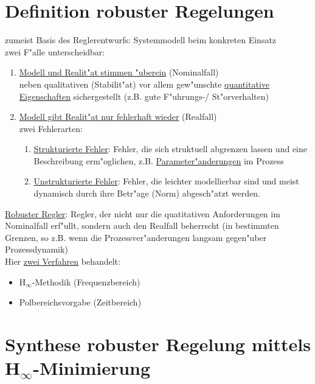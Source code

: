\documentclass[openany,a4paper,11pt]{book}
\begin{document}
\section{Definition robuster Regelungen}
zumeist Basis des Reglerentwurfs: Systemmodell beim konkreten Einsatz\\
zwei F"alle unterscheidbar: \begin{enumerate}
    \item \uline{Modell und Realit"at stimmen "uberein} (Nominalfall)\\
    neben qualitativen (Stabilit"at) vor allem gew"unschte \uline{quantitative Eigenschaften} sichergestellt (z.B. gute F"uhrungs-/ St"orverhalten)
    \item \uline{Modell gibt Realit"at nur fehlerhaft wieder} (Realfall)\\
    zwei Fehlerarten:\begin{enumerate}
        \item \uline{Strukturierte Fehler}: Fehler, die sich struktuell abgrenzen lassen und eine Beschreibung erm"oglichen, z.B. \uline{Parameter"anderungen} im Prozess
        \item \uline{Unstrukturierte Fehler}: Fehler, die leichter modellierbar sind und meist dynamisch durch ihre Betr"age (Norm) abgesch"atzt werden.
    \end{enumerate}
\end{enumerate}
\uline{Robuster Regler}: Regler, der nicht nur die quatitativen Anforderungen im Nominalfall erf"ullt, sondern auch den Realfall beherrscht (in bestimmten Grenzen, so z.B. wenn die Prozessver"anderungen langsam gegen"uber Prozessdynamik)\\
Hier \uline{zwei Verfahren} behandelt:\begin{itemize}
    \item H${}_\infty$-Methodik (Frequenzbereich)
    \item Polbereichsvorgabe (Zeitbereich)
\end{itemize}
\section{Synthese robuster Regelung mittels H${}_\infty$-Minimierung}
\end{document}
